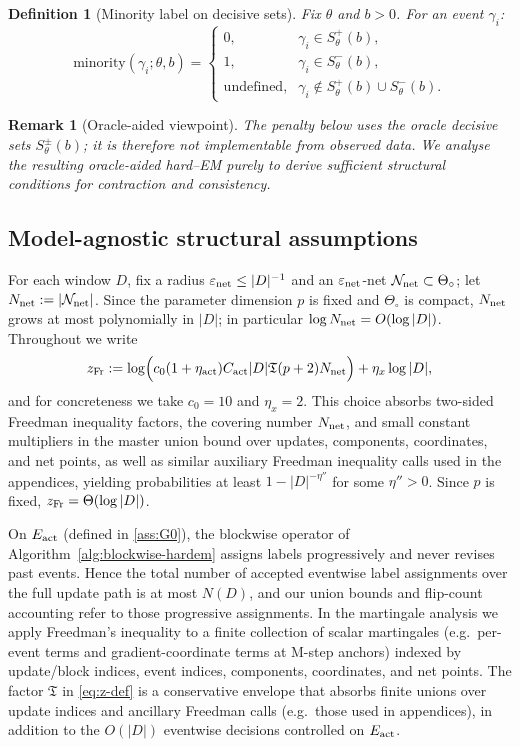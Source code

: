 \documentclass{statsoc}
\newtheorem{definition}[definition]{Definition}
\newtheorem{remark}[remark]{Remark}
\newcommand{\1}{\mathbbm{1}}
\newcommand{\Tmax}{\mathfrak{T}}
\begin{document}
\begin{definition}[Minority label on decisive sets]\label{def:minority}
Fix $\theta$ and $b>0$. For an event $\gamma_i$:
\[
\text{minority}(\gamma_i;\theta,b)=
\begin{cases}
0,& \gamma_i\in S_\theta^+(b),\\
1,& \gamma_i\in S_\theta^-(b),\\
\text{undefined},& \gamma_i\notin S_\theta^+(b)\cup S_\theta^-(b).
\end{cases}
\]
\end{definition}

\begin{remark}[Oracle-aided viewpoint]\label{rem:oracle}
The penalty below uses the oracle decisive sets $S_\theta^\pm(b)$; it is therefore not implementable from observed data. We analyse the resulting oracle-aided hard--EM purely to derive sufficient structural conditions for contraction and consistency.
\end{remark}


\subsection{Model-agnostic structural assumptions}\label{sec:assumptions}

For each window $D$, fix a radius $\varepsilon_{\rm net}\le |D|^{-1}$ and an $\varepsilon_{\rm net}$-net $\mathcal N_{\rm net}\subset\Theta_\circ$; let $N_{\rm net}:=|\mathcal N_{\rm net}|$.
Since the parameter dimension $p$ is fixed and $\Theta_\circ$ is compact, $N_{\rm net}$ grows at most polynomially in $|D|$; in particular $\log N_{\rm net}=O(\log|D|)$. Throughout we write
\begin{equation}\label{eq:z-def}
z_{\rm Fr}:=\log\!\Big(c_0 (1+\eta_{\rm act}) C_{\rm act} |D| \Tmax (p+2) N_{\rm net}\Big) + \eta_x\log|D|,
\end{equation}
and for concreteness we take $c_0=10$ and $\eta_x=2$. This choice absorbs two-sided Freedman inequality factors, the covering number $N_{\rm net}$, and small constant multipliers in the master union bound over updates, components, coordinates, and net points, as well as similar auxiliary Freedman inequality calls used in the appendices, yielding probabilities at least $1-|D|^{-\eta''}$ for some $\eta''>0$. Since $p$ is fixed, $z_{\rm Fr}=\Theta(\log|D|)$.

On $E_{\rm act}$ (defined in \cref{ass:G0}), the blockwise operator of Algorithm~\ref{alg:blockwise-hardem} assigns labels progressively and never revises past events. Hence the total number of accepted eventwise label assignments over the full update path is at most $N(D)$, and our union bounds and flip-count accounting refer to those progressive assignments. In the martingale analysis we apply Freedman's inequality to a finite collection of scalar martingales (e.g.\ per-event terms and gradient-coordinate terms at M-step anchors) indexed by update/block indices, event indices, components, coordinates, and net points. The factor $\Tmax$ in \eqref{eq:z-def} is a conservative envelope that absorbs finite unions over update indices and ancillary Freedman calls (e.g.\ those used in appendices), in addition to the $O(|D|)$ eventwise decisions controlled on $E_{\rm act}$.
\end{document}
